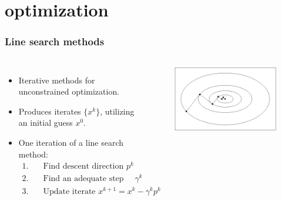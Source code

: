 \documentclass[9pt]{beamer}
\begin{document}
\section{optimization}
\begin{frame}
\frametitle{Line search methods}
\begin{columns}
\begin{itemize}
\item{Iterative methods for unconstrained optimization.}
\item{Produces iterates $\{x^k\}$, utilizing an initial guess $x^0$.}
\item{One iteration of a line search method:}
{\small
\begin{align*}
1.\quad& \textrm{Find descent direction $p^k$}\\
2.\quad& \textrm{Find an adequate step length $\gamma^k$}\\
3.\quad& \textrm{Update iterate $x^{k+1} = x^k -\gamma^k p^k$}
\end{align*}
}%
\end{itemize}
\begin{figure}[!h]
\centering
\includegraphics[scale=0.3,angle=90]{SD.png}
\end{figure}
\end{columns}
\end{frame}
\end{document}
